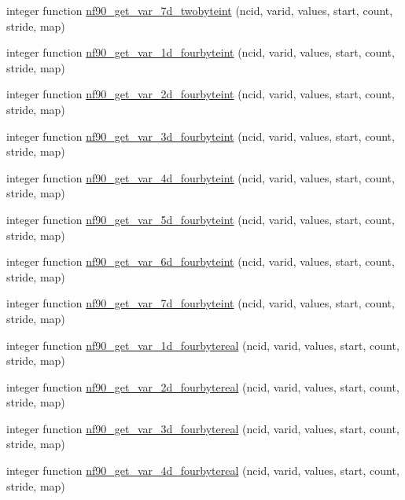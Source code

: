 \begin{DoxyCompactItemize}
\item 
integer function \hyperlink{netcdf__expanded_8f90_ac879ceaba40b8b12c68a9e4d904daa70}{nf90\+\_\+get\+\_\+var\+\_\+7d\+\_\+twobyteint} (ncid, varid, values, start, count, stride, map)
\item 
integer function \hyperlink{netcdf__expanded_8f90_a5847c43a08008a77c3244aab2fe5e1c3}{nf90\+\_\+get\+\_\+var\+\_\+1d\+\_\+fourbyteint} (ncid, varid, values, start, count, stride, map)
\item 
integer function \hyperlink{netcdf__expanded_8f90_a2e9b41225f576c06a4e8c2b63f1b02f8}{nf90\+\_\+get\+\_\+var\+\_\+2d\+\_\+fourbyteint} (ncid, varid, values, start, count, stride, map)
\item 
integer function \hyperlink{netcdf__expanded_8f90_a1dbb8f5ccd9b6597d6d9572f39548083}{nf90\+\_\+get\+\_\+var\+\_\+3d\+\_\+fourbyteint} (ncid, varid, values, start, count, stride, map)
\item 
integer function \hyperlink{netcdf__expanded_8f90_a3a7fc4659ac040e3169e48186b0747f7}{nf90\+\_\+get\+\_\+var\+\_\+4d\+\_\+fourbyteint} (ncid, varid, values, start, count, stride, map)
\item 
integer function \hyperlink{netcdf__expanded_8f90_a5be0de164b8f9734a8c2a45896b84a19}{nf90\+\_\+get\+\_\+var\+\_\+5d\+\_\+fourbyteint} (ncid, varid, values, start, count, stride, map)
\item 
integer function \hyperlink{netcdf__expanded_8f90_a54887ba654e7e855249046e945eb9dc6}{nf90\+\_\+get\+\_\+var\+\_\+6d\+\_\+fourbyteint} (ncid, varid, values, start, count, stride, map)
\item 
integer function \hyperlink{netcdf__expanded_8f90_aa272951274444d96dd207d571a349901}{nf90\+\_\+get\+\_\+var\+\_\+7d\+\_\+fourbyteint} (ncid, varid, values, start, count, stride, map)
\item 
integer function \hyperlink{netcdf__expanded_8f90_a2fc97d96a4f51977806ac1685ee09d8f}{nf90\+\_\+get\+\_\+var\+\_\+1d\+\_\+fourbytereal} (ncid, varid, values, start, count, stride, map)
\item 
integer function \hyperlink{netcdf__expanded_8f90_a198873518ae0f4c5b2c517eeed4408ed}{nf90\+\_\+get\+\_\+var\+\_\+2d\+\_\+fourbytereal} (ncid, varid, values, start, count, stride, map)
\item 
integer function \hyperlink{netcdf__expanded_8f90_af04e63804907cd0cff2db5672e7981ea}{nf90\+\_\+get\+\_\+var\+\_\+3d\+\_\+fourbytereal} (ncid, varid, values, start, count, stride, map)
\item 
integer function \hyperlink{netcdf__expanded_8f90_af3359c354a26ee5e41cf214955c750a6}{nf90\+\_\+get\+\_\+var\+\_\+4d\+\_\+fourbytereal} (ncid, varid, values, start, count, stride, map)

\end{DoxyCompactItemize}
